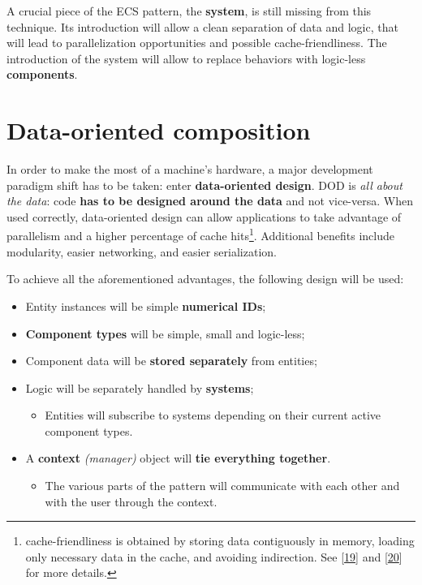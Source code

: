 \documentclass[oneside, 12pt, a4paper, openany]{book}
\providecommand{\tightlist}{%
  \setlength{\itemsep}{0pt}\setlength{\parskip}{0pt}}
\begin{document}
A crucial piece of the ECS pattern, the \textbf{system}, is still
missing from this technique. Its introduction will allow a clean
separation of data and logic, that will lead to parallelization
opportunities and possible cache-friendliness. The introduction of the
system will allow to replace behaviors with logic-less
\textbf{components}.

\section{Data-oriented composition}\label{data-oriented-composition}

In order to make the most of a machine's hardware, a major development
paradigm shift has to be taken: enter \textbf{data-oriented design}. DOD
is \emph{all about the data}: code \textbf{has to be designed around the
data} and not vice-versa. When used correctly, data-oriented design can
allow applications to take advantage of parallelism and a higher
percentage of cache hits\footnote{cache-friendliness is obtained by
  storing data contiguously in memory, loading only necessary data in
  the cache, and avoiding indirection. See
  {[}\protect\hyperlink{ref-ithare_allocations}{19}{]} and
  {[}\protect\hyperlink{ref-scee_oop_pitfalls}{20}{]} for more details.}.
Additional benefits include modularity, easier networking, and easier
serialization.

To achieve all the aforementioned advantages, the following design will
be used:

\begin{itemize}
\item
  Entity instances will be simple \textbf{numerical IDs};
\item
  \textbf{Component types} will be simple, small and logic-less;
\item
  Component data will be \textbf{stored separately} from entities;
\item
  Logic will be separately handled by \textbf{systems};

  \begin{itemize}
  \tightlist
  \item
    Entities will subscribe to systems depending on their current active
    component types.
  \end{itemize}
\item
  A \textbf{context} \emph{(manager)} object will \textbf{tie everything
  together}.

  \begin{itemize}
  \tightlist
  \item
    The various parts of the pattern will communicate with each other
    and with the user through the context.
  \end{itemize}
\end{itemize}
\end{document}
